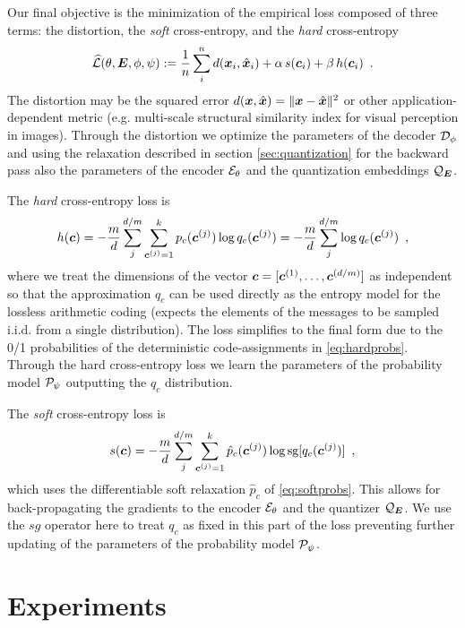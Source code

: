 \documentclass{article} %
\newcommand{\Lsh}{\widehat{\Ls}}
\newcommand{\pc}{p_c}
\newcommand{\qc}{q_c}
\newcommand{\gEt}{\gE_\theta}
\newcommand{\gQE}{\gQ_\mE}
\newcommand{\gDp}{\gD_\phi}
\newcommand{\vxh}{\hat{\vx}}
\newcommand{\gPp}{\gP_{\psi}}
\begin{document}
Our final objective is the minimization of the empirical loss composed of three terms: the distortion, the \emph{soft} cross-entropy, and the \emph{hard} cross-entropy
\begin{align}\label{eq:loss_final}
\Lsh(\theta, \mE, \phi, \psi) := \frac{1}{n}\sum_i^n d(\vx_i, \vxh_i) + \alpha \, s(\vc_i) + \beta \, h(\vc_i) \enspace .
\end{align}
The distortion may be the squared error $d(\vx, \vxh) = \Vert \vx - \vxh \Vert^2$ or other application-dependent metric (e.g. multi-scale structural similarity index for visual perception in images).
Through the distortion we optimize the parameters of the decoder $\gDp$ and using the relaxation described in section \ref{sec:quantization} for the backward pass also the parameters of the encoder $\gEt$ and the quantization embeddings $\gQE$.

The \emph{hard} cross-entropy loss is
\begin{align}
h(\vc) = - \frac{m}{d} \sum_j^{d/m} \sum_{\vc^{(j)} = 1}^k \pc(\vc^{(j)}) \log \qc(\vc^{(j)})
= - \frac{m}{d} \sum_j^{d/m} \log \qc(\vc^{(j)}) \enspace ,
\end{align}
where we treat the dimensions of the vector ${\bm{c}} = [{\bm{c}}^{(1)}, \ldots, {\bm{c}}^{(d/m)}]$ as independent so that the approximation $\qc$ can be used directly as the entropy model for the lossless arithmetic coding (expects the elements of the messages to be sampled i.i.d. from a single distribution).
The loss simplifies to the final form due to the 0/1 probabilities of the deterministic code-assignments in \eqref{eq:hardprobs}.
Through the hard cross-entropy loss we learn the parameters of the probability model $\gPp$ outputting the $\qc$ distribution.

The \emph{soft} cross-entropy loss is
\begin{align}
s(\vc) = - \frac{m}{d} \sum_j^{d/m} \sum_{\vc^{(j)} = 1}^k \hat{p}_c(\vc^{(j)}) \log \textrm{sg}[\qc(\vc^{(j)})] \enspace ,
\end{align}
which uses the differentiable soft relaxation $\hat{p}_c$ of \eqref{eq:softprobs}. 
This allows for back-propagating the gradients to the encoder $\gEt$ and the quantizer $\gQE$. 
We use the $sg$ operator here to treat $\qc$ as fixed in this part of the loss preventing further updating of the parameters of the probability model $\gPp$.


\section{Experiments}
\end{document}
